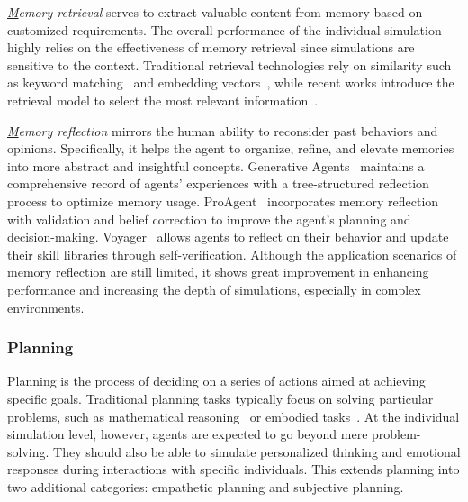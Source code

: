 
\textit{{\ul Memory retrieval}} serves to extract valuable content from memory based on customized requirements. The overall performance of the individual simulation highly relies on the effectiveness of memory retrieval since simulations are sensitive to the context.
Traditional retrieval technologies rely on similarity such as keyword matching~\cite{chen2024socialbenchsocialityevaluationroleplaying} and embedding vectors~\cite{lin2023agentsimsopensourcesandboxlarge}, while recent works introduce the retrieval model to select the most relevant information~\cite{chen2023chatcottoolaugmentedchainofthoughtreasoning,salemi2024lamplargelanguagemodels}.

\textit{{\ul Memory reflection}} mirrors the human ability to reconsider past behaviors and opinions. Specifically, it helps the agent to organize, refine, and elevate memories into more abstract and insightful concepts. Generative Agents~\cite{park2023generativeagentsinteractivesimulacra} maintains a comprehensive record of agents' experiences with a tree-structured reflection process to optimize memory usage. ProAgent~\cite{zhang2024proagentbuildingproactivecooperative} incorporates memory reflection with validation and belief correction to improve the agent’s planning and decision-making. Voyager~\cite{wang2023voyageropenendedembodiedagent} allows agents to reflect on their behavior and update their skill libraries through self-verification. Although the application scenarios of memory reflection are still limited, it shows great improvement in enhancing performance and increasing the depth of simulations, especially in complex environments.



\subsubsection{Planning}

Planning is the process of deciding on a series of actions aimed at achieving specific goals. Traditional planning tasks typically focus on solving particular problems, such as mathematical reasoning~\cite{wang2023plan} or embodied tasks~\cite{wu2023embodied, song2023llmplannerfewshotgroundedplanning}. At the individual simulation level, however, agents are expected to go beyond mere problem-solving. They should also be able to simulate personalized thinking and emotional responses during interactions with specific individuals. This extends planning into two additional categories: empathetic planning and subjective planning.

